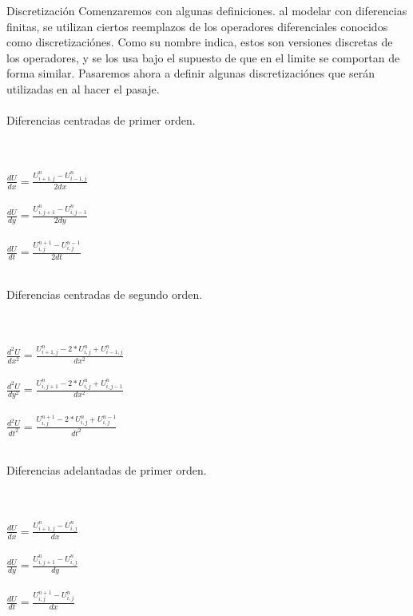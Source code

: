 
\begin{section}{Discretización}
Comenzaremos con algunas definiciones. al modelar con diferencias finitas, se utilizan ciertos reemplazos de los operadores diferenciales conocidos como discretizaciónes. Como su nombre indica, estos son versiones discretas de los operadores, y se los usa bajo el supuesto de que en el limite se comportan de forma similar. Pasaremos ahora a definir algunas discretizaciónes que serán utilizadas en al hacer el pasaje.
~\\
~\\
Diferencias centradas de primer orden.
\begin{center}

~\\
~\\
$\frac{dU}{dx} = \frac{U^{n}_{i+1,j} - U^{n}_{i-1,j}}{2dx} $
~\\
~\\
$\frac{dU}{dy} = \frac{U^{n}_{i,j+1} - U^{n}_{i,j-1}}{2dy} $
~\\
~\\
$\frac{dU}{dt} = \frac{U^{n+1}_{i,j} - U^{n-1}_{i,j}}{2dt} $
~\\
~\\
\end{center}

Diferencias centradas de segundo orden.
\begin{center}

~\\
~\\
$\frac{d^{2}U}{dx^{2}} = \frac{ U^{n}_{i+1,j} - 2*U^{n}_{i,j} + U^{n}_{i-1,j}}{dx^2}$
~\\
~\\
$\frac{d^{2}U}{dy^{2}} = \frac{ U^{n}_{i,j+1} - 2*U^{n}_{i,j} + U^{n}_{i,j-1}}{dx^2}$
~\\
~\\
$\frac{d^{2}U}{dt^{2}} = \frac{ U^{n+1}_{i,j} - 2*U^{n}_{i,j} + U^{n-1}_{i,j}}{dt^2}$
~\\
~\\
\end{center}

Diferencias adelantadas de primer orden.
\begin{center}

~\\
~\\
$\frac{dU}{dx} = \frac{U^{n}_{i+1,j} - U^{n}_{i,j}}{dx} $
~\\
~\\
$\frac{dU}{dy} = \frac{U^{n}_{i,j+1} - U^{n}_{i,j}}{dy} $
~\\
~\\
$\frac{dU}{dt} = \frac{U^{n+1}_{i,j} - U^{n}_{i,j}}{dx} $
~\\
~\\
\end{center}


\end{section}
